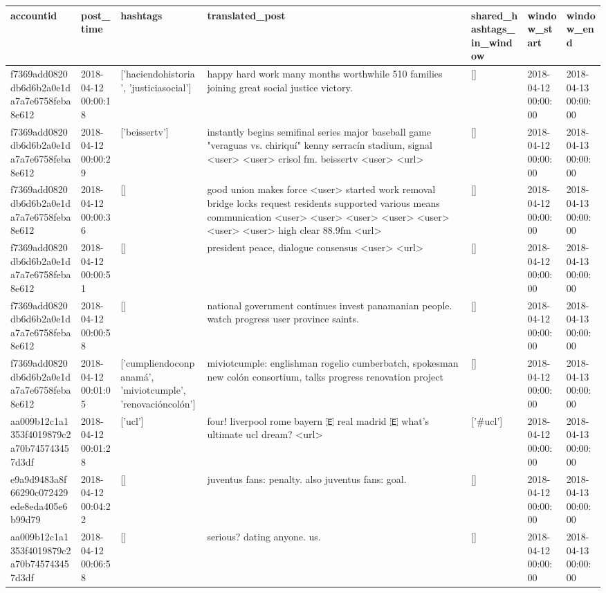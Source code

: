 \begin{tabular}{lllllll}
\toprule
accountid & post\_time & hashtags & translated\_post & shared\_hashtags\_in\_window & window\_start & window\_end \\
\midrule
f7369add0820db6d6b2a0e1da7a7e6758feba8e612 & 2018-04-12 00:00:18 & ['haciendohistoria', 'justiciasocial'] & happy hard work many months worthwhile 510 families joining great social justice victory. & [] & 2018-04-12 00:00:00 & 2018-04-13 00:00:00 \\
f7369add0820db6d6b2a0e1da7a7e6758feba8e612 & 2018-04-12 00:00:29 & ['beissertv'] & instantly begins semifinal series major baseball game "veraguas vs. chiriquí" kenny serracín stadium, signal <user> <user> crisol fm. beissertv <user> <url> & [] & 2018-04-12 00:00:00 & 2018-04-13 00:00:00 \\
f7369add0820db6d6b2a0e1da7a7e6758feba8e612 & 2018-04-12 00:00:36 & [] & good union makes force <user> started work removal bridge locks request residents supported various means communication <user> <user> <user> <user> <user> <user> <user> high clear 88.9fm <url> & [] & 2018-04-12 00:00:00 & 2018-04-13 00:00:00 \\
f7369add0820db6d6b2a0e1da7a7e6758feba8e612 & 2018-04-12 00:00:51 & [] & president peace, dialogue consensus <user> <url> & [] & 2018-04-12 00:00:00 & 2018-04-13 00:00:00 \\
f7369add0820db6d6b2a0e1da7a7e6758feba8e612 & 2018-04-12 00:00:58 & [] & national government continues invest panamanian people. watch progress user province saints. & [] & 2018-04-12 00:00:00 & 2018-04-13 00:00:00 \\
f7369add0820db6d6b2a0e1da7a7e6758feba8e612 & 2018-04-12 00:01:05 & ['cumpliendoconpanamá', 'miviotcumple', 'renovacióncolón'] & miviotcumple: englishman rogelio cumberbatch, spokesman new colón consortium, talks progress renovation project & [] & 2018-04-12 00:00:00 & 2018-04-13 00:00:00 \\
aa009b12c1a1353f4019879c2a70b745743457d3df & 2018-04-12 00:01:28 & ['ucl'] & four! liverpool rome bayern 🇪 real madrid 🇪 what's ultimate ucl dream? <url> & ['#ucl'] & 2018-04-12 00:00:00 & 2018-04-13 00:00:00 \\
e9a9d9483a8f66290c072429ede8eda405e6b99d79 & 2018-04-12 00:04:22 & [] & juventus fans: penalty. also juventus fans: goal. & [] & 2018-04-12 00:00:00 & 2018-04-13 00:00:00 \\
aa009b12c1a1353f4019879c2a70b745743457d3df & 2018-04-12 00:06:58 & [] & serious? dating anyone. us. & [] & 2018-04-12 00:00:00 & 2018-04-13 00:00:00 \\

\end{tabular}

